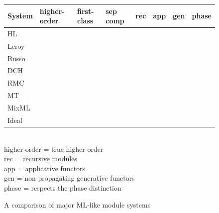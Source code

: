 \begin{figure}
	\small
\begin{tabular}{|l|l|l|l|l|l|l|l|}
	\hline
System & higher-order & first-class & sep comp & rec & app & gen & phase\\
	\hline
	HL \cite{lillibridge94} & \ex & \chk & \chk & \ex & \ex & \ex & \chk \\
	\hline
	Leroy \cite{leroy95} & \ex & \ex & \chk & \ex & \chk & \ex & \chk \\
	\hline
	Russo \cite{russo01} & \ex & \chk & \chk & \chk & \chk & \chk & \chk \\
	\hline
	DCH \cite{dhc03} & \ex & \chk & \ex & \ex & \chk & \chk & \chk \\
	\hline
	RMC \cite{dreyer07} & \ex & \ex & \ex & \chk & \ex & \chk & \chk\\
	\hline
	MT \cite{mt94} & \chk & \ex & \ex & \ex & \ex & \chk & \chk \\
	\hline
	MixML \cite{mixml} & \ex & \chk & \chk & \chk & \ex & \chk & \ex \\
	\hline
	Ideal & \chk & \chk & \chk & \chk & \ex & \chk & \chk \\
	\hline
\end{tabular}\\
higher-order = true higher-order\\
rec = recursive modules\\
app = applicative functors\\
gen = non-propagating generative functors\\
phase = respects the phase distinction
\caption{A comparison of major ML-like module systems}
\label{fig:sys-features}
\end{figure}		 										
 
